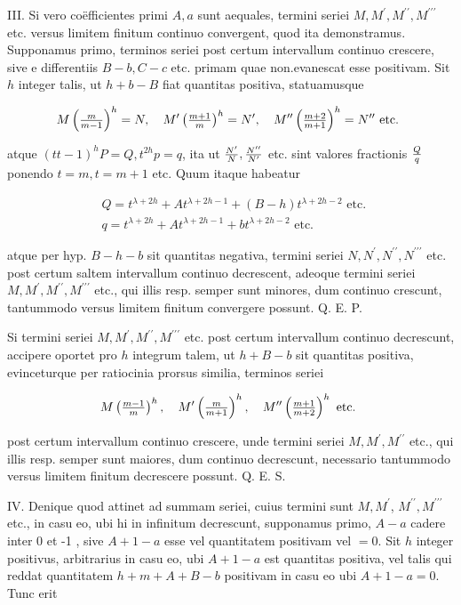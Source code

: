 \documentclass[twoside,12pt, showframe]{memoir}
\let\oldfrac\frac
\def\frac#1#2{\mathchoice{\tfrac{#1}{#2}}{\oldfrac{#1}{#2}}{\genfrac{}{}{}{2}{#1}{#2\mathstrut}}{\genfrac{}{}{}{3}{#1}{#2\mathstrut}}}
\begin{document}
III. Si vero coëfficientes primi \(A, a\) sunt aequales, termini seriei \(M, M^{\prime}, M^{\prime \prime}, M^{\prime \prime \prime}\) etc. versus limitem finitum continuo convergent, quod ita demonstramus. Supponamus primo, terminos seriei post certum intervallum continuo crescere, sive e differentiis \(B-b, C-c\) etc. primam quae non.evanescat
esse positivam. Sit \(h\) integer talis, ut \(h+b-B\) fiat quantitas positiva, statuamusque

\[
M\left(\frac{m}{m-1}\right)^{h}=N, \quad M^{\prime}\left(\frac{m+1}{m}\right)^{h}=N^{\prime}, \quad M^{\prime \prime}\left(\frac{m+2}{m+1}\right)^{h}=N^{\prime \prime} \text { etc. }
\]

atque \((t t-1)^{h} P=Q, t^{2 h} p=q\), ita ut \(\frac{N^{\prime}}{N}, \frac{N^{\prime \prime}}{N^{\prime}}\) etc. sint valores fractionis \(\frac{Q}{q}\) ponendo \(t=m, t=m+1\) etc. Quum itaque habeatur

\[
\begin{aligned}
& Q=t^{\lambda+2 h}+A t^{\lambda+2 h-1}+(B-h) t^{\lambda+2 h-2} \text { etc. } \\
& q=t^{\lambda+2 h}+A t^{\lambda+2 h-1}+b t^{\lambda+2 h-2} \text { etc. }
\end{aligned}
\]

atque per hyp. \(B-h-b\) sit quantitas negativa, termini seriei \(N, N^{\prime}, N^{\prime \prime}, N^{\prime \prime \prime}\) etc. post certum saltem intervallum continuo decrescent, adeoque termini seriei \(M, M^{\prime}, M^{\prime \prime}, M^{\prime \prime \prime}\) etc., qui illis resp. semper sunt minores, dum continuo crescunt, tantummodo versus limitem finitum convergere possunt. Q. E. P.

Si termini seriei \(M, M^{\prime}, M^{\prime \prime}, M^{\prime \prime \prime}\) etc. post certum intervallum continuo decrescunt, accipere oportet pro \(h\) integrum talem, ut \(h+B-b\) sit quantitas positiva, evinceturque per ratiocinia prorsus similia, terminos seriei

\[
M\left(\frac{m-1}{m}\right)^{h}, \quad M^{\prime}\left(\frac{m}{m+1}\right)^{h}, \quad M^{\prime \prime}\left(\frac{m+1}{m+2}\right)^{h} \text { etc. }
\]

post certum intervallum continuo crescere, unde termini seriei \(M, M^{\prime}, M^{\prime \prime}\) etc., qui illis resp. semper sunt maiores, dum continuo decrescunt, necessario tantummodo versus limitem finitum decrescere possunt. Q. E. S.

IV. Denique quod attinet ad summam seriei, cuius termini sunt \(M, M^{\prime}\), \(M^{\prime \prime}, M^{\prime \prime \prime}\) etc., in casu eo, ubi hi in infinitum decrescunt, supponamus primo, \(A-a\) cadere inter 0 et -1 , sive \(A+1-a\) esse vel quantitatem positivam vel \(=0\). Sit \(h\) integer positivus, arbitrarius in casu eo, ubi \(A+1-a\) est quantitas positiva, vel talis qui reddat quantitatem \(h+m+A+B-b\) positivam in casu eo ubi \(A+1-a=0\). Tunc erit
\end{document}

